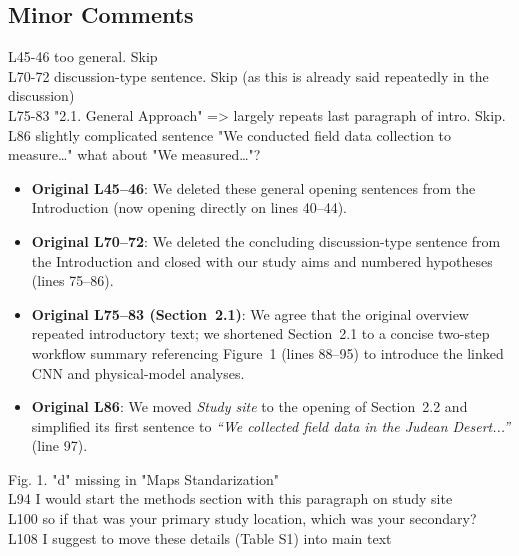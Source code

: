 \documentclass[12pt,english]{reviewresponse}
\begin{document}
\subsection*{Minor Comments}

\begin{revcomment}
L45-46 too general. Skip\\
L70-72 discussion-type sentence. Skip (as this is already said repeatedly in the discussion)\\
L75-83 "2.1. General Approach" => largely repeats last paragraph of intro. Skip.\\
L86 slightly complicated sentence "We conducted field data collection to measure…" what about "We measured…"?
\end{revcomment}

\begin{revresponse}
\begin{itemize}[leftmargin=*, itemsep=0.2em]
    \item \textbf{Original L45--46}: We deleted these general opening sentences from the Introduction (now opening directly on lines 40--44).
    \item \textbf{Original L70--72}: We deleted the concluding discussion-type sentence from the Introduction and closed with our study aims and numbered hypotheses (lines 75--86).
    \item \textbf{Original L75--83 (Section~2.1)}: We agree that the original overview repeated introductory text; we shortened Section~2.1 to a concise two-step workflow summary referencing Figure~1 (lines 88--95) to introduce the linked CNN and physical-model analyses.
    \item \textbf{Original L86}: We moved \textit{Study site} to the opening of Section~2.2 and simplified its first sentence to \textit{``We collected field data in the Judean Desert...''} (line 97).
\end{itemize}
\end{revresponse}

\begin{revcomment}
Fig. 1. "d" missing in "Maps Standarization"\\
L94 I would start the methods section with this paragraph on study site\\
L100 so if that was your primary study location, which was your secondary?\\
L108 I suggest to move these details (Table S1) into main text
\end{revcomment}
\end{document}
